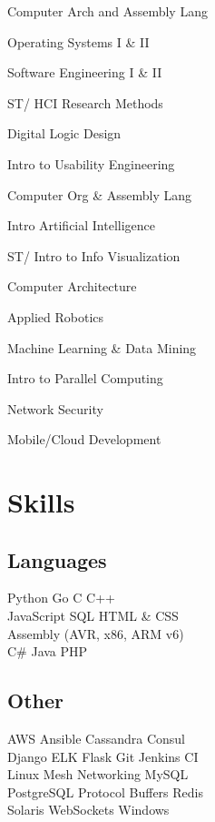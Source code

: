 \documentclass[letterpaper]{deedy-resume} %
\begin{document}
\begin{minipage}[t]{0.33\textwidth}
\begin{tightitemize}
\item Computer Arch and Assembly Lang
\item Operating Systems I \& II
\item Software Engineering I \& II
\item ST/ HCI Research Methods
\item Digital Logic Design
\item Intro to Usability Engineering
\item Computer Org \& Assembly Lang
\item Intro Artificial Intelligence
\item ST/ Intro to Info Visualization
\item Computer Architecture
\item Applied Robotics
\item Machine Learning \& Data Mining
\item Intro to Parallel Computing
\item Network Security
\item Mobile/Cloud Development
\end{tightitemize}

\sectionspace %


\section{Skills}

\subsection{Languages}

Python \textbullet{} Go \textbullet{} C \textbullet{} C++\\
JavaScript \textbullet{} SQL \textbullet{} HTML \& CSS\\
Assembly (AVR, x86, ARM v6)\\
C\# \textbullet{} Java \textbullet{} PHP \\

\subsection{Other}
AWS \textbullet{} Ansible \textbullet{} Cassandra \textbullet{} Consul \\
Django \textbullet{} ELK \textbullet{} Flask \textbullet{} Git \textbullet{} Jenkins CI \\
Linux \textbullet{} Mesh Networking \textbullet{} MySQL \\
PostgreSQL \textbullet{} Protocol Buffers \textbullet{} Redis \\
Solaris \textbullet{} WebSockets \textbullet{} Windows


\end{minipage}
\end{document}
